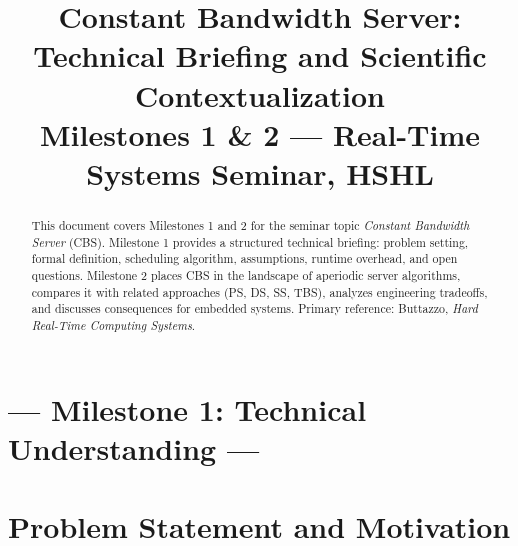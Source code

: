 \documentclass[conference]{IEEEtran}
\begin{document}
\title{Constant Bandwidth Server:\\Technical Briefing and Scientific Contextualization\\
{\footnotesize Milestones 1 \& 2 --- Real-Time Systems Seminar, HSHL}}

\author{
}

\maketitle

\begin{abstract}
This document covers Milestones 1 and 2 for the seminar topic
\emph{Constant Bandwidth Server} (CBS).
Milestone 1 provides a structured technical briefing: problem setting,
formal definition, scheduling algorithm, assumptions, runtime overhead,
and open questions.
Milestone 2 places CBS in the landscape of aperiodic server algorithms,
compares it with related approaches (PS, DS, SS, TBS), analyzes
engineering tradeoffs, and discusses consequences for embedded systems.
Primary reference: Buttazzo, \textit{Hard Real-Time Computing Systems}.
\end{abstract}


\section*{--- Milestone 1: Technical Understanding ---}

\section{Problem Statement and Motivation}
\end{document}
